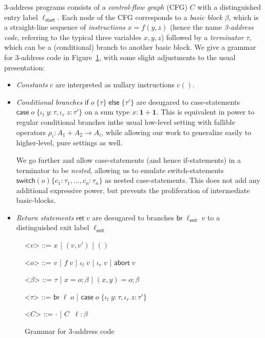 \documentclass[acmsmall,screen,review]{acmart}
\newcommand{\mb}[1]{\ensuremath{\mathbf{#1}}}
\newcommand{\ms}[1]{\ensuremath{\mathsf{#1}}}
\newcommand{\lto}{:}
\newcommand{\linl}[1]{\iota_l\;{#1}}
\newcommand{\linr}[1]{\iota_r\;{#1}}
\newcommand{\labort}[1]{\ms{abort}\;{#1}}
\newcommand{\brb}[2]{\ms{br}\;#1\;#2}
\newcommand{\ite}[3]{\ms{if}\;#1\;\{#2\}\;\ms{else}\;\{#3\}}
\newcommand{\casestmt}[5]{\ms{case}\;#1\;\{\linl{#2} \lto #3, \linr{#4} \lto #5\}}
\begin{document}
3-address programs consists of a \emph{control-flow graph} (CFG) $C$ with a distinguished entry
label $\ell_{\ms{start}}$. Each node of the CFG corresponds to a \emph{basic block} $\beta$, which
is a straight-line sequence of \emph{instructions} $x = f(y, z)$ (hence the name \emph{3-address
code}, referring to the typical three variables $x, y, z$) followed by a \emph{terminator} $\tau$,
which can be a (conditional) branch to another basic block. We give a grammar for 3-address code in
Figure~\ref{fig:3addr-grammar}, with some slight adjustments to the usual presentation:
\begin{itemize}
  \item \emph{Constants} $c$ are interpreted as nullary instructions $c()$.
  \item \emph{Conditional branches} $\ite{o}{\tau}{\tau'}$ are desugared to case-statements
  $\casestmt{o}{y}{\tau}{z}{\tau'}$ on a sum type $x : \mb{1} + \mb{1}$. This is equivalent in power
  to regular conditional branches inthe usual low-level setting with fallible operators $\rho_i :
  A_1 + A_2 \to A_i$, while allowing our work to generalize easily to higher-level, pure settings as
  well.

  We go further and allow case-statements (and hence if-statements) in a terminator to be
  \emph{nested}, allowing us to emulate switch-statements $\ms{switch}(o) \{c_1 : \tau_1 ,
  ... , c_n : \tau_n\}$ as nested case-statements. This does not add any additional
  expressive power, but prevents the proliferation of intermediate basic-blocks.

  \item \emph{Return statements} $\ms{ret}\;v$ are desugared to branches $\brb{\ell_{\ms{exit}}}{v}$
  to a distinguished exit label $\ell_{\ms{exit}}$
\end{itemize}

\begin{figure}[H]
  \begin{center}
    \begin{grammar}
      <\(v\)> ::= \(x\) \;|\; \((v, v')\) \;|\; \(()\)

      <\(o\)> ::= \(v\) \;|\; \(f\;v\) \;|\; \(\linl{v}\) \;|\; \(\linr{v}\) \;|\; \(\labort{v}\)

      <\(\beta\)> ::= \(\tau\) 
      \;|\; \(x = o ; \beta\)
      \;|\; \((x, y) = o ; \beta\)

      <\(\tau\)> ::= \(\brb{\ell}{o}\) \;|\; $\casestmt{o}{y}{\tau}{z}{\tau'}$
      
      <\(C\)> ::= \(\cdot\) \;|\; \(C \;\; \ell : \beta\)
    \end{grammar}
  \end{center}
  \caption{Grammar for 3-address code}
  \Description{}
  \label{fig:3addr-grammar}
\end{figure}
\end{document}
